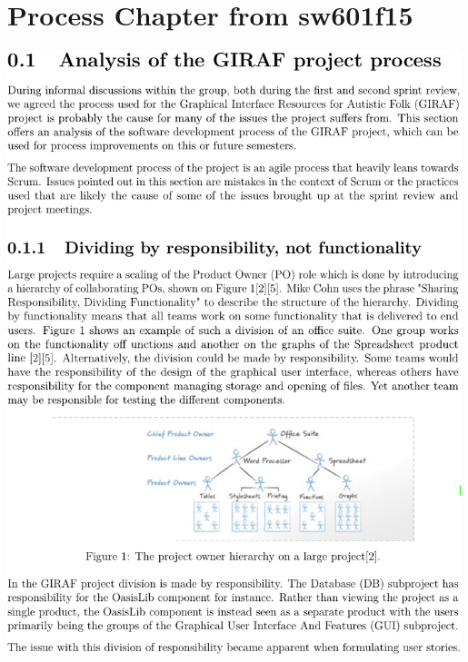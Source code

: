\chapter{Process Chapter from sw601f15}\label{app:601}
\noindent\includegraphics[page=1,width=0.99\textwidth]{part_appendix/sw601f15.pdf}


